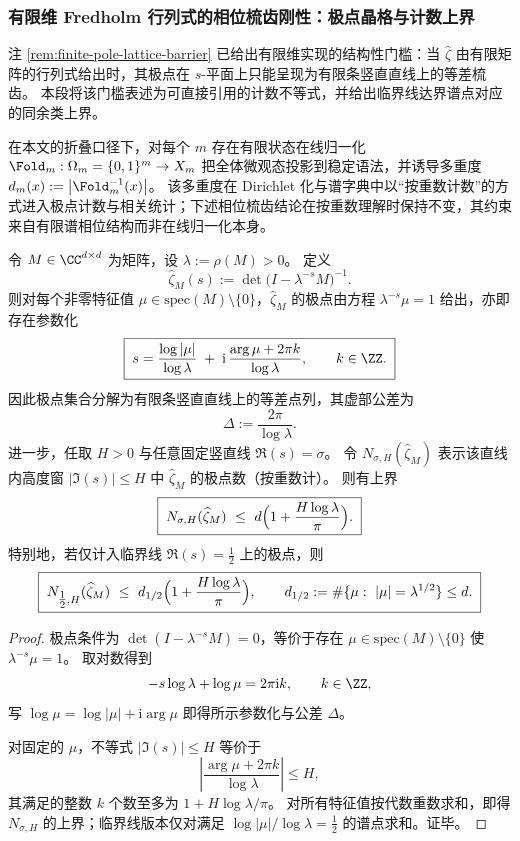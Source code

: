 \subsubsection{有限维 Fredholm 行列式的相位梳齿刚性：极点晶格与计数上界}\label{subsubsec:operator-finite-dimensional-phase-comb}
注 \ref{rem:finite-pole-lattice-barrier} 已给出有限维实现的结构性门槛：当 \(\widehat\zeta\) 由有限矩阵的行列式给出时，其极点在 \(s\)-平面上只能呈现为有限条竖直直线上的等差梳齿。
本段将该门槛表述为可直接引用的计数不等式，并给出临界线达界谱点对应的同余类上界。

\begin{remark}[有限状态折叠的多重度与极点重数]\label{rem:operator-fold-multiplicity-pole-multiplicity}
在本文的折叠口径下，对每个 \(m\) 存在有限状态在线归一化
\(
\Fold_m:\Omega_m=\{0,1\}^m\to X_m
\)
把全体微观态投影到稳定语法，并诱导多重度
\(
d_m(x):=\bigl|\Fold_m^{-1}(x)\bigr|
\)。
该多重度在 Dirichlet 化与谱字典中以“按重数计数”的方式进入极点计数与相关统计；下述相位梳齿结论在按重数理解时保持不变，其约束来自有限谱相位结构而非在线归一化本身。
\end{remark}

\begin{theorem}\label{thm:operator-finite-dimensional-zhat-pole-counting}
令 \(M\in\CC^{d\times d}\) 为矩阵，设 \(\lambda:=\rho(M)>0\)。
定义
\[
\widehat\zeta_M(s):=\det\!\bigl(I-\lambda^{-s}M\bigr)^{-1}.
\]
则对每个非零特征值 \(\mu\in\mathrm{spec}(M)\setminus\{0\}\)，\(\widehat\zeta_M\) 的极点由方程 \(\lambda^{-s}\mu=1\) 给出，亦即存在参数化
\[
\boxed{\;
s
=\frac{\log|\mu|}{\log\lambda}
\;+\;
\mathrm{i}\,\frac{\arg\mu+2\pi k}{\log\lambda},
\qquad k\in\ZZ.\;}
\]
因此极点集合分解为有限条竖直直线上的等差点列，其虚部公差为
\[
\Delta:=\frac{2\pi}{\log\lambda}.
\]
进一步，任取 \(H>0\) 与任意固定竖直线 \(\Re(s)=\sigma\)。
令 \(N_{\sigma,H}(\widehat\zeta_M)\) 表示该直线内高度窗 \(|\Im(s)|\le H\) 中 \(\widehat\zeta_M\) 的极点数（按重数计）。
则有上界
\[
\boxed{\;
N_{\sigma,H}(\widehat\zeta_M)\ \le\ d\Bigl(1+\frac{H\log\lambda}{\pi}\Bigr).\;}
\]
特别地，若仅计入临界线 \(\Re(s)=\tfrac12\) 上的极点，则
\[
\boxed{\;
N_{\tfrac12,H}(\widehat\zeta_M)\ \le\ d_{1/2}\Bigl(1+\frac{H\log\lambda}{\pi}\Bigr),\qquad
d_{1/2}:=\#\{\mu:\ |\mu|=\lambda^{1/2}\}\le d.\;}
\]
\end{theorem}
\begin{proof}
极点条件为 \(\det(I-\lambda^{-s}M)=0\)，等价于存在 \(\mu\in\mathrm{spec}(M)\setminus\{0\}\) 使 \(\lambda^{-s}\mu=1\)。
取对数得到
\[
-s\log\lambda+\log\mu=2\pi\mathrm{i}k,\qquad k\in\ZZ,
\]
写 \(\log\mu=\log|\mu|+\mathrm{i}\arg\mu\) 即得所示参数化与公差 \(\Delta\)。
\par
对固定的 \(\mu\)，不等式 \(|\Im(s)|\le H\) 等价于
\[
\left|\frac{\arg\mu+2\pi k}{\log\lambda}\right|\le H,
\]
其满足的整数 \(k\) 个数至多为 \(1+H\log\lambda/\pi\)。
对所有特征值按代数重数求和，即得 \(N_{\sigma,H}\) 的上界；临界线版本仅对满足 \(\log|\mu|/\log\lambda=\tfrac12\) 的谱点求和。证毕。
\end{proof}

